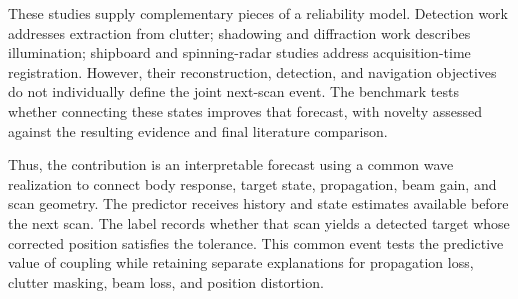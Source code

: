 \documentclass[10pt,letterpaper]{article}
\begin{document}
These studies supply complementary pieces of a reliability model. Detection work addresses extraction from clutter; shadowing and diffraction work describes illumination; shipboard and spinning-radar studies address acquisition-time registration. However, their reconstruction, detection, and navigation objectives do not individually define the joint next-scan event. The benchmark tests whether connecting these states improves that forecast, with novelty assessed against the resulting evidence and final literature comparison.

Thus, the contribution is an interpretable forecast using a common wave realization to connect body response, target state, propagation, beam gain, and scan geometry. The predictor receives history and state estimates available before the next scan. The label records whether that scan yields a detected target whose corrected position satisfies the tolerance. This common event tests the predictive value of coupling while retaining separate explanations for propagation loss, clutter masking, beam loss, and position distortion.

\clearpage


\end{document}
